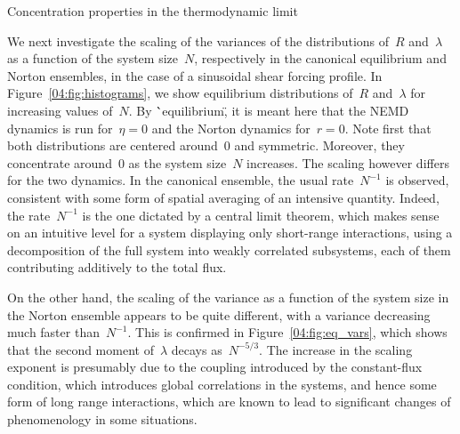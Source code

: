     \begin{subsection}{Concentration properties in the thermodynamic limit}\label{04:subsec:numerical_thermo_limit}

    We next investigate the scaling of the variances of the distributions of~$R$ and~$\lambda$ as a function of the system size~$N$, respectively in the canonical equilibrium and Norton ensembles, in the case of a sinusoidal shear forcing profile. In Figure~\ref{04:fig:histograms}, we show equilibrium distributions of~$R$ and~$\lambda$ for increasing values of~$N$. By \``equilibrium\", it is meant here that the NEMD dynamics is run for~$\eta=0$ and the Norton dynamics for~$r=0$.
    Note first that both distributions are centered around~0 and symmetric. Moreover, they concentrate around~0 as the system size~$N$ increases. The scaling however differs for the two dynamics. In the canonical ensemble, the usual rate~$N^{-1}$ is observed, consistent with some form of spatial averaging of an intensive quantity. Indeed, the rate~$N^{-1}$ is the one dictated by a central limit theorem, which makes sense on an intuitive level for a system displaying only short-range interactions, using a decomposition of the full system into weakly correlated subsystems, each of them contributing additively to the total flux.
    
    On the other hand, the scaling of the variance as a function of the system size in the Norton ensemble appears to be quite different, with a variance decreasing much faster than~$N^{-1}$. This is confirmed in Figure~\ref{04:fig:eq_vars}, which shows that the second moment of~$\lambda$ decays as~$N^{-5/3}$. The increase in the scaling exponent is presumably due to the coupling introduced by the constant-flux condition, which introduces global correlations in the systems, and hence some form of long range interactions, which are known to lead to significant changes of phenomenology in some situations.


\end{subsection}

